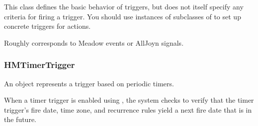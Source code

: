 \documentclass{myproc}
\begin{document}
This class defines the basic behavior of triggers, but does not itself specify
any criteria for firing a trigger. You should use instances of subclasses of
 to set up concrete triggers for actions. 


\textcolor{red2}{Roughly corresponds to Meadow events or AllJoyn signals}.

\subsubsection{HMTimerTrigger}
An  object represents a trigger based on periodic timers.

When a timer trigger is enabled using , the
system checks to verify that the timer trigger’s fire date, time zone, and
recurrence rules yield a next fire date that is in the future. 
\end{document}
